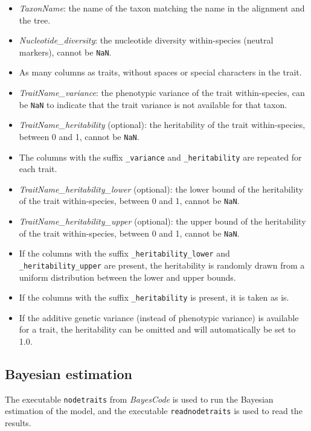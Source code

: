 \documentclass{article}
\begin{document}
\begin{itemize}
    \item \emph{TaxonName}: the name of the taxon matching the name in the alignment and the tree.
    \item \emph{Nucleotide\_diversity}: the nucleotide diversity within-species (neutral markers), cannot be \texttt{NaN}.
    \item As many columns as traits, without spaces or special characters in the trait.
    \item \emph{TraitName\_variance}: the phenotypic variance of the trait within-species, can be \texttt{NaN} to indicate that the trait variance is not available for that taxon.
    \item \emph{TraitName\_heritability} (optional): the heritability of the trait within-species, between 0 and 1, cannot be \texttt{NaN}.
    \item The columns with the suffix \texttt{\_variance} and \texttt{\_heritability} are repeated for each trait.
    \item \emph{TraitName\_heritability\_lower} (optional): the lower bound of the heritability of the trait within-species, between 0 and 1, cannot be \texttt{NaN}.
    \item \emph{TraitName\_heritability\_upper} (optional): the upper bound of the heritability of the trait within-species, between 0 and 1, cannot be \texttt{NaN}.
    \item If the columns with the suffix \texttt{\_heritability\_lower} and \texttt{\_heritability\_upper} are present, the heritability is randomly drawn from a uniform distribution between the lower and upper bounds.
    \item If the columns with the suffix \texttt{\_heritability} is present, it is taken as is.
    \item If the additive genetic variance (instead of phenotypic variance) is available for a trait, the heritability can be omitted and will automatically be set to 1.0.
\end{itemize}

\newpage
\subsection{Bayesian estimation}\label{subsec:running-nodetraitsand-readnodetraits}

The executable \texttt{nodetraits} from \textit{BayesCode} is used to run the Bayesian estimation of the model, and the executable \texttt{readnodetraits} is used to read the results.
\end{document}
